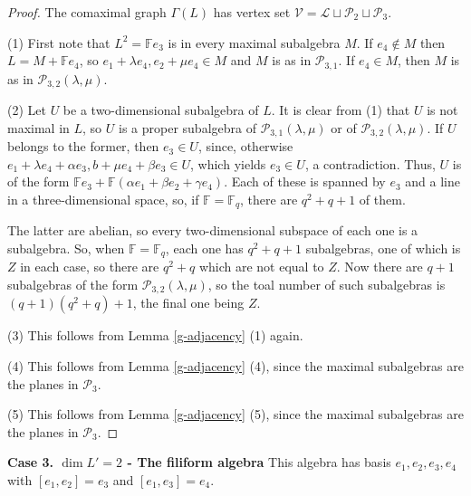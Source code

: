\documentclass[11pt]{amsart}
\theoremstyle{plain}
\def\F{\mathbb{F}}
\begin{document}
\begin{proof} The comaximal graph $\Gamma(L)$ has vertex set $\mathcal{V} = \mathcal{L} \sqcup \mathcal{P}_2 \sqcup \mathcal{P}_3$.

\smallskip

\noindent (1) First note that $L^2=\F e_3$ is in every maximal subalgebra $M$. If $e_4\notin M$ then $L=M+\F e_4$, so $e_1+\lambda e_4, e_2+\mu e_4\in M$ and $M$ is as in $\mathcal{P}_{3,1}$. If $e_4\in M$, then $M$ is as in $\mathcal{P}_{3,2}(\lambda,\mu)$.

\smallskip 

\noindent (2) Let $U$ be a two-dimensional subalgebra of $L$. It is clear from (1) that $U$ is not maximal in $L$, so $U$ is a proper subalgebra of $\mathcal{P}_{3,1}(\lambda,\mu)$ or of  $\mathcal{P}_{3,2}(\lambda,\mu)$. If $U$ belongs to the former, then $e_3\in U$, since, otherwise $e_1+\lambda e_4+\alpha e_3, b+\mu e_4+\beta e_3\in U$, which yields $e_3\in U$, a contradiction. Thus, $U$ is of the form $\F e_3+\F(\alpha e_1+\beta e_2+\gamma e_4)$. Each of these is spanned by $e_3$ and a line in a three-dimensional space, so, if $\F=\F_q$, there are $q^2+q+1$ of them. 
\par

The latter are abelian, so every two-dimensional subspace of each one is a subalgebra. So, when $\F=\F_q$, each one has $q^2+q+1$ subalgebras, one of which is $Z$ in each case, so there are $q^2+q$ which are not equal to $Z$. Now there are $q+1$ subalgebras of the form $\mathcal{P}_{3,2}(\lambda,\mu)$, so the toal number of such subalgebras is $(q+1)(q^2+q)+1$, the final one being $Z$.

\smallskip

\noindent (3) This follows from Lemma \ref{g-adjacency} (1) again.

\smallskip

\noindent (4) This follows from Lemma \ref{g-adjacency} (4), since the maximal subalgebras are the planes in $\mathcal{P}_3$.

\smallskip

\noindent (5) This follows from Lemma \ref{g-adjacency} (5), since the maximal subalgebras are the planes in $\mathcal{P}_3$.
    
\end{proof}
  \textbf{Case 3. $\dim L'=2$ - The filiform algebra}
This algebra has basis $e_1,e_2,e_3,e_4$ with $[e_1,e_2]=e_3$ and $[e_1,e_3]=e_4$. 
\end{document}
